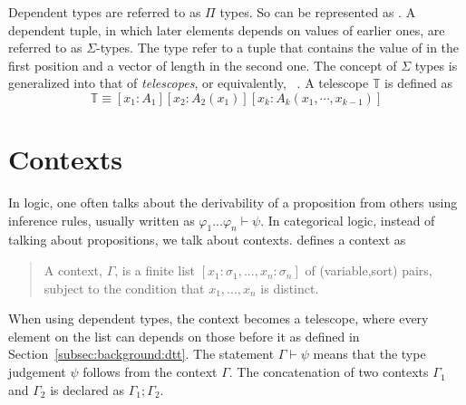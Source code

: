 Dependent types are referred to as $\Pi$ types. So  can be represented as . A dependent tuple, in which later elements depends on values of earlier ones, are referred to as $\Sigma$-types. The type  refer to a tuple that contains the value of  in the first position and a vector of length  in the second one. 
The concept of $\Sigma$ types is generalized into that of \emph{telescopes}, or equivalently,  ~\cite{pollack2002dependently}. A telescope $\mathbb{T}$ is defined as 
\[ \mathbb{T} \equiv [x_1 : A_1][x_2 : A_2(x_1)][x_k : A_k(x_1,\cdots,x_{k-1})] \] 


\section{Contexts}
\label{sec:background:context}
In logic, one often talks about the derivability of a proposition from others using inference rules, usually written as $\varphi_1 ... \varphi_n \vdash \psi$.  In categorical logic, instead of talking about propositions, we talk about contexts. \cite{handbook1993CategoricalLogic} defines a context as 
\begin{quote}
A context, $\Gamma$, is a finite list $[x_1 : \sigma_1, ... , x_n : \sigma_n]$ of (variable,sort) pairs, subject to the condition that $x_1, ... , x_n$ is distinct.  
\end{quote}
When using dependent types, the context becomes a telescope, where every element on the list can depends on those before it as defined in Section~\ref{subsec:background:dtt}. The statement $\Gamma \vdash \psi$ means that the type judgement $\psi$ follows from the context $\Gamma$. The concatenation of two contexts $\Gamma_1$ and $\Gamma_2$ is declared as $\Gamma_1 ; \Gamma_2$.  

